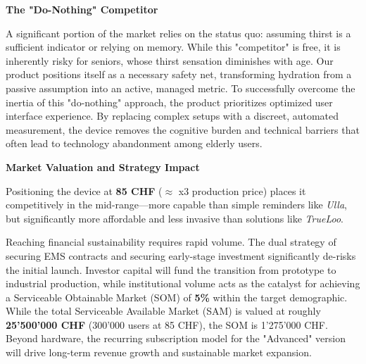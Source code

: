 \documentclass{article}
\begin{document}
\textbf{The "Do-Nothing" Competitor}\vspace{0.2cm}

A significant portion of the market relies on the status quo: assuming thirst is a sufficient indicator or relying on memory. While this "competitor" is free, it is inherently risky for seniors, whose thirst sensation diminishes with age. Our product positions itself as a necessary safety net, transforming hydration from a passive assumption into an active, managed metric. To successfully overcome the inertia of this "do-nothing" approach, the product prioritizes optimized user interface experience. By replacing complex setups with a discreet, automated measurement, the device removes the cognitive burden and technical barriers that often lead to technology abandonment among elderly users.\vspace{0.2cm}

\textbf{Market Valuation and Strategy Impact}\vspace{0.2cm}

Positioning the device at \textbf{85 CHF} ($\approx$ x3 production price) places it competitively in the mid-range—more capable than simple reminders like \textit{Ulla}, but significantly more affordable and less invasive than solutions like \textit{TrueLoo}.

Reaching financial sustainability requires rapid volume. The dual strategy of securing EMS contracts and securing early-stage investment significantly de-risks the initial launch. Investor capital will fund the transition from prototype to industrial production, while institutional volume acts as the catalyst for achieving a Serviceable Obtainable Market (SOM) of \textbf{5\%} within the target demographic. While the total Serviceable Available Market (SAM) is valued at roughly \textbf{25'500'000 CHF} (300'000 users at 85 CHF), the SOM is 1'275'000 CHF. Beyond hardware, the recurring subscription model for the "Advanced" version will drive long-term revenue growth and sustainable market expansion.


\end{document}
